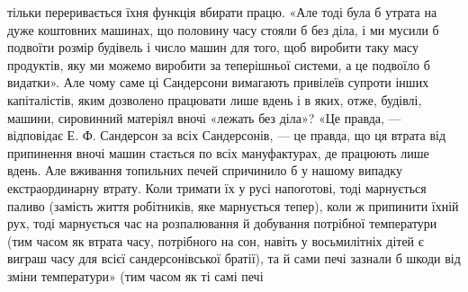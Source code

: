 тільки переривається їхня функція вбирати працю. «Але тоді
була б утрата на дуже коштовних машинах, що половину часу
стояли б без діла, і ми мусили б подвоїти розмір будівель і число
машин для того, щоб виробити таку масу продуктів, яку ми можемо
виробити за теперішньої системи, а це подвоїло б видатки». Але
чому саме ці Сандерсони вимагають привілеїв супроти інших
капіталістів, яким дозволено працювати лише вдень і в яких,
отже, будівлі, машини, сировинний матеріял вночі «лежать без
діла»? «Це правда, — відповідає Е. Ф. Сандерсон за всіх Сандерсонів,
— це правда, що ця втрата від припинення вночі машин
стається по всіх мануфактурах, де працюють лише вдень. Але
вживання топильних печей спричинило б у нашому випадку
екстраординарну втрату. Коли тримати їх у русі напоготові, тоді
марнується паливо (замість життя робітників, яке марнується тепер),
коли ж припинити їхній рух, тоді марнується час на розпалювання
й добування потрібної температури (тим часом як втрата
часу, потрібного на сон, навіть у восьмилітніх дітей є виграш
часу для всієї сандерсонівської братії), та й сами печі зазнали
б шкоди від зміни температури» (тим часом як ті самі печі
